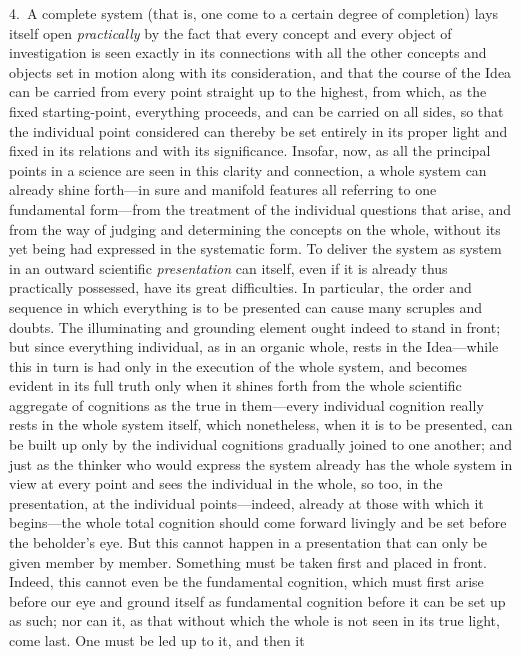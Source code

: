 \documentclass[12pt,a4paper]{book}
\begin{document}
4.~A complete system (that is, one come to a certain degree of completion) lays itself
open \emph{practically} by the fact that every concept and every object of investigation
is seen exactly in its connections with all the other concepts and objects set in motion
along with its consideration, and that the course of the Idea can be carried from every
point straight up to the highest, from which, as the fixed starting-point, everything
proceeds, and can be carried on all sides, so that the individual point considered can
thereby be set entirely in its proper light and fixed in its relations and with its
significance. Insofar, now, as all the principal points in a science are seen in this
clarity and connection, a whole system can already shine forth---in sure and manifold
features all referring to one fundamental form---from the treatment of the individual
questions that arise, and from the way of judging and determining the concepts on the
whole, without its yet being had expressed in the systematic form. To deliver the system
as system in an outward scientific \emph{presentation} can itself, even if it is already
thus practically possessed, have its great difficulties. In particular, the order and
sequence in which everything is to be presented can cause many scruples and doubts. The
illuminating and grounding element ought indeed to stand in front; but since everything
individual, as in an organic whole, rests in the Idea---while this in turn is had only in
the execution of the whole system, and becomes evident in its full truth only when it
shines forth from the whole scientific aggregate of cognitions as the true in
them---every individual cognition really rests in the whole system itself, which
nonetheless, when it is to be presented, can be built up only by the individual cognitions
gradually joined to one another; and just as the thinker who would express the system
already has the whole system in view at every point and sees the individual in the whole,
so too, in the presentation, at the individual points---indeed, already at those with
which it begins---the whole total cognition should come forward livingly and be set before
the beholder's eye. But this cannot happen in a presentation that can only be given member
by member. Something must be taken first and placed in front. Indeed, this cannot even be
the fundamental cognition, which must first arise before our eye and ground itself as
fundamental cognition before it can be set up as such; nor can it, as that without which
the whole is not seen in its true light, come last. One must be led up to it, and then it
\end{document}
